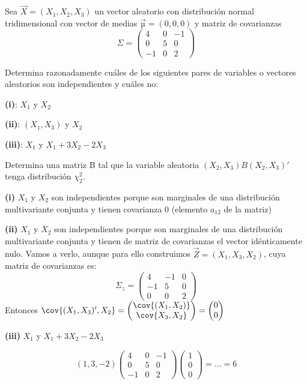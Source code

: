 \begin{problem}[2]

Sea $\vec{X} = (X_1 , X_2 , X_3 )$ un vector aleatorio con distribución normal tridimensional con vector de medias $\vec{µ} = (0, 0, 0)$ y matriz de covarianzas
\[ Σ = \begin{pmatrix}
4&0&−1 \\
0&5&0\\
−1&0&2
\end{pmatrix}
\]

\ppart Determina razonadamente cuáles de los siguientes pares de variables o vectores aleatorios son independientes y cuáles no:  

\textbf{(i)}: $X_1$ y $X_2$

\textbf{(ii)}: $(X_1 , X_3 )$ y $X_2$ 

\textbf{(iii)}: $X_1$ y $X_1 + 3X_2 − 2X_3$

\ppart Determina una matriz B tal que la variable aleatoria $(X_2 , X_3 )B(X_2 , X_3)'$ tenga distribución $χ^2_2$.

\solution

\spart 

\textbf{(i)} $X_1$ y $X_2$ son independientes porque son marginales de una distribución multivariante conjunta y tienen covarianza 0 (elemento $a_{12}$ de la matriz)

\textbf{(ii)} $X_1$ y $X_2$ son independientes porque son marginales de una distribución multivariante conjunta y tienen de matriz de covarianzas el vector idénticamente nulo. Vamos a verlo, aunque para ello construimos $\vec{Z} = (X_1,X_3,X_2)$, cuya matriz de covarianzas es:\[ Σ_z = \begin{pmatrix}
4&-1&0\\
-1&5&0\\
0&0&2
\end{pmatrix}\]
Entonces $\cov{(X_1,X_3)',X_2} = \begin{pmatrix}\cov{(X_1,X_2)} \\ \cov{X_3,X_2}\end{pmatrix} = \begin{pmatrix}0\\0\end{pmatrix}$

\textbf{(iii)} $X_1$ y $X_1 + 3X_2 − 2X_3$

\[
(1,3,-2) \begin{pmatrix}
4&0&−1 \\
0&5&0\\
−1&0&2
\end{pmatrix} \begin{pmatrix}1\\0\\0\end{pmatrix} = ... = 6
\]


\end{problem}
